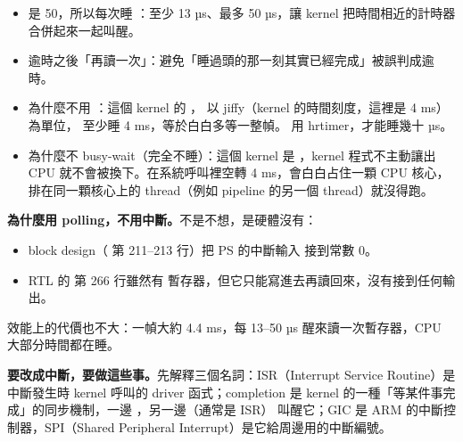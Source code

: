 \begin{itemize}
\item {} 是 50，所以每次睡 ：至少 13 µs、最多 50 µs，讓 kernel 把時間相近的計時器合併起來一起叫醒。
\item 逾時之後「再讀一次」：避免「睡過頭的那一刻其實已經完成」被誤判成逾時。
\item 為什麼不用 ：這個 kernel 的 ， 以 jiffy（kernel 的時間刻度，這裡是 4 ms）為單位， 至少睡 4 ms，等於白白多等一整幀。 用 hrtimer，才能睡幾十 µs。
\item 為什麼不 busy-wait（完全不睡）：這個 kernel 是 ，kernel 程式不主動讓出 CPU 就不會被換下。在系統呼叫裡空轉 4 ms，會白白占住一顆 CPU 核心，排在同一顆核心上的 thread（例如 pipeline 的另一個 thread）就沒得跑。
\end{itemize}

\textbf{為什麼用 polling，不用中斷。}不是不想，是硬體沒有：
\begin{itemize}
\item block design（ 第 211–213 行）把 PS 的中斷輸入  接到常數 0。
\item RTL 的  第 266 行雖然有  暫存器，但它只能寫進去再讀回來，沒有接到任何輸出。
\end{itemize}
效能上的代價也不大：一幀大約 4.4 ms，每 13–50 µs 醒來讀一次暫存器，CPU 大部分時間都在睡。

\textbf{要改成中斷，要做這些事。}先解釋三個名詞：ISR（Interrupt Service Routine）是中斷發生時 kernel 呼叫的 driver 函式；completion 是 kernel 的一種「等某件事完成」的同步機制，一邊 ，另一邊（通常是 ISR） 叫醒它；GIC 是 ARM 的中斷控制器，SPI（Shared Peripheral Interrupt）是它給周邊用的中斷編號。


